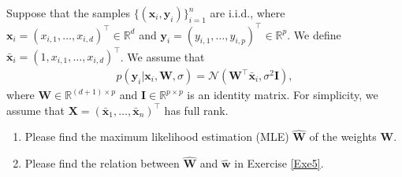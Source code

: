 \documentclass[11pt,letter,notitlepage]{article}
\begin{document}
\begin{exercise}
    Suppose that the samples $\{(\mathbf{x}_i,\mathbf{y}_i)\}^n_{i=1}$ are i.i.d., where $\mathbf{x}_i =(x_{i,1}, \dots, x_{i,d})^{\top} \in \mathbb{R}^{d}$  and $\mathbf{y}_i = (y_{i,1}, \dots, y_{i,p})^{\top} \in \mathbb{R}^{p}$. We define $\bar{\mathbf{x}}_i = (1 , x_{i,1} ,\dots , x_{i,d})^{\top} $.  We assume that
    \begin{align*}
        p(\mathbf{y}_i|\mathbf{x}_i, \mathbf{W}, \sigma ) = \mathcal{N} ( \mathbf{W}^{\top} \bar{\mathbf{x}}_i  , \sigma^2 \mathbf{I}),
    \end{align*}
    where $\mathbf{W} \in \mathbb{R}^{(d+1) \times p}$ and $\mathbf{I} \in \mathbb{R}^{p \times p}$ is an identity matrix.
    For simplicity, we assume that $\mathbf{X} = (\bar{\mathbf{x}}_1 , \dots, \bar{\mathbf{x}}_n)^{\top}$ has full rank.

    \begin{enumerate}
        \item Please find the maximum likelihood estimation (MLE) $\hat{\mathbf{W}}$ of the weights $\mathbf{W}$.
        \item Please find the relation between $\hat{\mathbf{W}}$ and $\hat{\mathbf{w}}$ in Exercise \ref{Exe5}.
    \end{enumerate}
\end{exercise}
\end{document}
